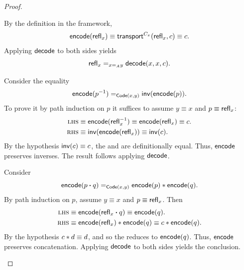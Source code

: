 \begin{proof}${}$
    \begin{description}[font=\normalfont\itshape]

        \item[Reflexivity.]
        By the definition in the framework,
        \[
            \mathsf{encode}(\mathsf{refl}_x)
                \equiv
                \mathsf{transport}^{C_x}(\mathsf{refl}_x,c)\equiv c.
        \]
        Applying $\mathsf{decode}$ to both sides yields
        \[
            \mathsf{refl}_x\mathrel{=_{x\mathrel{=_{A}}y}}\mathsf{decode}(x,x,c).
        \]

        \item[Symmetry.]
        Consider the equality
        \[
            \mathsf{encode}(p^{-1})
            \mathrel{=_{\mathsf{Code}(x,y)}}
            \mathsf{inv}(\mathsf{encode}(p)).
        \]
        To prove it by path induction on $p$ it suffices to assume $y\equiv x$ and $p\equiv\mathsf{refl}_x$:
        \begin{align*}
            \textsc{lhs} &\equiv \mathsf{encode}(\mathsf{refl}_x^{-1}) \equiv \mathsf{encode}(\mathsf{refl}_x) \equiv c.\\
            \textsc{rhs} &\equiv \mathsf{inv}(\mathsf{encode}(\mathsf{refl}_x)) \equiv \mathsf{inv}(c).
        \end{align*}
        By the hypothesis $\mathsf{inv}(c) \equiv c$, the \lhs and \rhs are definitionally equal.
        Thus, $\mathsf{encode}$ preserves inverses. The result follows applying $\mathsf{decode}$.

        \item[Transitivity.]
        Consider
        \[
            \mathsf{encode}(p\mathbin{\boldsymbol{\cdot}} q)
            \mathrel{=_{\mathsf{Code}(x,y)}}
            \mathsf{encode}(p)\mathbin\ast\mathsf{encode}(q).
        \]
        By path induction on $p$, assume $y\equiv x$ and $p\equiv\mathsf{refl}_x$. Then
        \begin{align*}
            \textsc{lhs}&\equiv\mathsf{encode}(\mathsf{refl}_x\mathbin{\boldsymbol{\cdot}} q)
                \equiv\mathsf{encode}(q).\\
            \textsc{rhs}&\equiv
                \mathsf{encode}(\mathsf{refl}_x)\mathbin\ast\mathsf{encode}(q)
                \equiv c \mathbin\ast \mathsf{encode}(q).
        \end{align*}
        By the hypothesis $c\mathbin\ast d\equiv d$, and so the \rhs reduces to $\mathsf{encode}(q)$. Thus, $\mathsf{encode}$ preserves concatenation. Applying $\mathsf{decode}$ to both sides yields the conclusion. \qedhere
    \end{description}
\end{proof}

